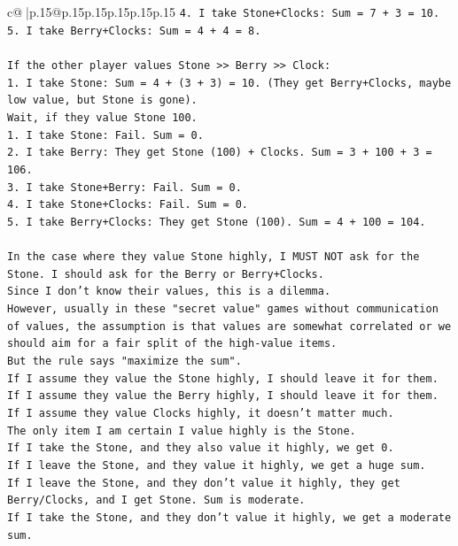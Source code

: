\documentclass{article}
\begin{document}
{\begin{supertabular}{c@{$\;$}|p{.15\linewidth}@{}p{.15\linewidth}p{.15\linewidth}p{.15\linewidth}p{.15\linewidth}p{.15\linewidth}}
{{{\texttt{4. I take Stone+Clocks: Sum = 7 + 3 = 10.} \\
\texttt{5. I take Berry+Clocks: Sum = 4 + 4 = 8.} \\
\\ 
\texttt{If the other player values Stone >> Berry >> Clock:} \\
\texttt{1. I take Stone: Sum = 4 + (3 + 3) = 10. (They get Berry+Clocks, maybe low value, but Stone is gone).} \\
\texttt{Wait, if they value Stone 100.} \\
\texttt{1. I take Stone: Fail. Sum = 0.} \\
\texttt{2. I take Berry: They get Stone (100) + Clocks. Sum = 3 + 100 + 3 = 106.} \\
\texttt{3. I take Stone+Berry: Fail. Sum = 0.} \\
\texttt{4. I take Stone+Clocks: Fail. Sum = 0.} \\
\texttt{5. I take Berry+Clocks: They get Stone (100). Sum = 4 + 100 = 104.} \\
\\ 
\texttt{In the case where they value Stone highly, I MUST NOT ask for the Stone. I should ask for the Berry or Berry+Clocks.} \\
\texttt{Since I don't know their values, this is a dilemma.} \\
\texttt{However, usually in these "secret value" games without communication of values, the assumption is that values are somewhat correlated or we should aim for a fair split of the high{-}value items.} \\
\texttt{But the rule says "maximize the sum".} \\
\texttt{If I assume they value the Stone highly, I should leave it for them.} \\
\texttt{If I assume they value the Berry highly, I should leave it for them.} \\
\texttt{If I assume they value Clocks highly, it doesn't matter much.} \\
\texttt{The only item I am certain I value highly is the Stone.} \\
\texttt{If I take the Stone, and they also value it highly, we get 0.} \\
\texttt{If I leave the Stone, and they value it highly, we get a huge sum.} \\
\texttt{If I leave the Stone, and they don't value it highly, they get Berry/Clocks, and I get Stone. Sum is moderate.} \\
\texttt{If I take the Stone, and they don't value it highly, we get a moderate sum.} \\
}}}
\end{supertabular}}
\end{document}
